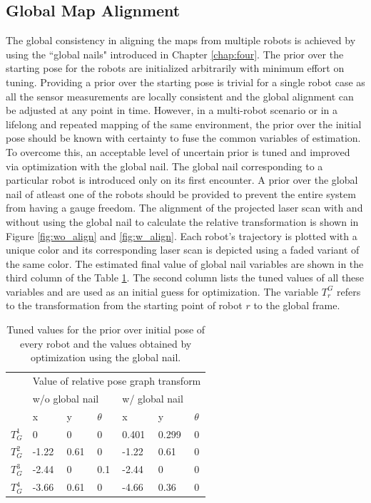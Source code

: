 \subsection{Global Map Alignment}
The global consistency in aligning the maps from multiple robots is achieved by using the ``global nails" introduced in Chapter \ref{chap:four}. The prior over the starting pose for the robots are initialized arbitrarily with minimum effort on tuning. Providing a prior over the starting pose is trivial for a single robot case as all the sensor measurements are locally consistent and the global alignment can be adjusted at any point in time. However, in a multi-robot scenario or in a lifelong and repeated mapping of the same environment, the prior over the initial pose should be known with certainty to fuse the common variables of estimation. To overcome this, an acceptable level of uncertain prior is tuned and improved via optimization with the global nail. The global nail corresponding to a particular robot is introduced only on its first encounter. A prior over the global nail of atleast one of the robots should be provided to prevent the entire system from having a gauge freedom. The alignment of the projected laser scan with and without using the global nail to calculate the relative transformation is shown in Figure \ref{fig:wo_align} and \ref{fig:w_align}. Each robot's trajectory is plotted with a unique color and its corresponding laser scan is depicted using a faded variant of the same color. The estimated final value of global nail variables are shown in the third column of the Table \ref{table:global_nail}. The second column lists the tuned values of all these variables and are used as an initial guess for optimization. The variable $T_r^G$ refers to the transformation from the starting point of robot $r$ to the global frame. 

\begin{table}[]
\centering
\caption{Tuned values for the prior over initial pose of every robot and the values obtained by optimization using the global nail.}
\label{table:global_nail}
\begin{tabular}{|l|l|l|l|l|l|l|}
\hline
\multirow{3}{*}{} & \multicolumn{6}{l|}{Value of relative pose graph transform} \\ \cline{2-7} 
 & \multicolumn{3}{l|}{w/o global nail} & \multicolumn{3}{l|}{w/ global nail} \\ \cline{2-7} 
 & x & y & $\theta$ & x & y & $\theta$ \\ \hline
$T_G^1$ & 0 & 0 & 0 & 0.401 & 0.299 & 0 \\ \hline
$T_G^2$ & -1.22 & 0.61 & 0 & -1.22 & 0.61 & 0 \\ \hline
$T_G^3$ & -2.44 & 0 & 0.1 & -2.44 & 0 & 0 \\ \hline
$T_G^4$ & -3.66 & 0.61 & 0 & -4.66 & 0.36 & 0 \\ \hline
\end{tabular}
\end{table}

